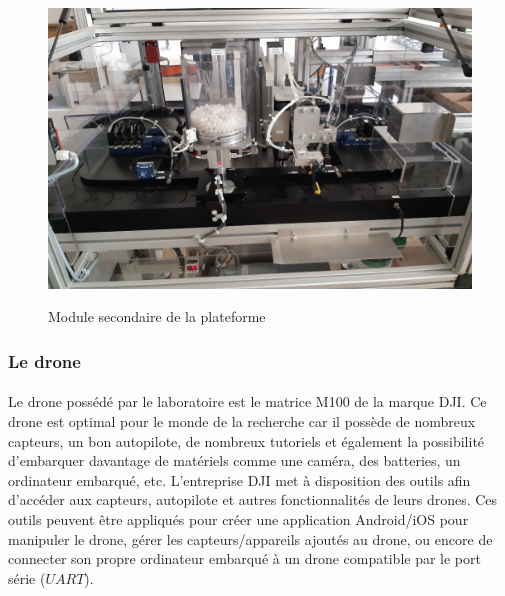                 \begin{figure}[H]
                    \centering
                    \begin{frame}{\includegraphics[width=1\textwidth]{image/vueensemble.jpg}}
                    \end{frame}
                    \caption{\label{fig:module-plateforme}Module secondaire de la plateforme}
                \end{figure}

            \subsubsection{Le drone}
            \label{part:existDrone}
				\paragraph*{}
				Le drone possédé par le laboratoire est le matrice M100 de la marque DJI. Ce drone est optimal pour le monde de la recherche car il possède de nombreux capteurs, un bon autopilote, de nombreux tutoriels et également la possibilité d'embarquer davantage de matériels comme une caméra, des batteries, un ordinateur embarqué, etc. L'entreprise DJI met à disposition des outils afin d'accéder aux capteurs, autopilote et autres fonctionnalités de leurs drones. Ces outils peuvent être appliqués pour créer une application Android/iOS pour manipuler le drone, gérer les capteurs/appareils ajoutés au drone, ou encore de connecter son propre ordinateur embarqué à un drone compatible par le port série ($UART$).
				
